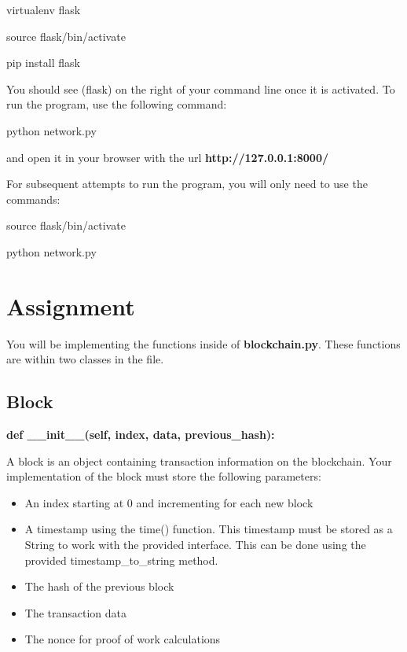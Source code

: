 \documentclass{article}
\begin{document}
\hspace*{6mm} virtualenv flask \par \vspace{5mm}

\hspace*{6mm} source flask/bin/activate \par \vspace{5mm}

\hspace*{6mm} pip install flask \par \vspace{5mm}

You should see (flask) on the right of your command line once it is activated. To run the program, use the following command: \par \vspace{5mm}

\hspace*{6mm} python network.py \par \vspace{5mm}
and open it in your browser with the url \textbf{http://127.0.0.1:8000/}\par \vspace{5mm}

For subsequent attempts to run the program, you will only need to use the commands:
\par \vspace{5mm}

\hspace*{6mm} source flask/bin/activate \par \vspace{5mm}
\hspace*{6mm} python network.py \par
\section{Assignment}

You will be implementing the functions inside of \textbf{blockchain.py}. These functions are within two classes in the file.

\subsection{Block}

\textbf{def \_\_init\_\_(self, index, data, previous\_hash):} \par 
A block is an object containing transaction information on the blockchain. Your implementation of the block must store the following parameters:
\begin{itemize}
  \item An index starting at 0 and incrementing for each new block
  \item A timestamp using the time() function. This timestamp must be stored as a String to work with the provided interface. This can be done using the provided timestamp\_to\_string method.
  \item The hash of the previous block
  \item The transaction data
  \item The nonce for proof of work calculations
\end{itemize}
\end{document}
